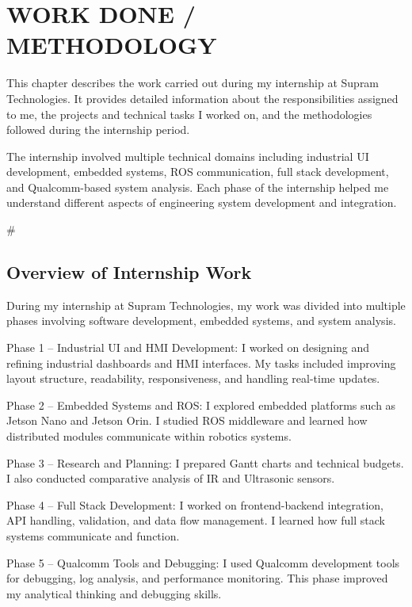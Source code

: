 \documentclass[12pt,a4paper]{report}
\begin{document}
\chapter{WORK DONE / METHODOLOGY}
\label{ch:work}


This chapter describes the work carried out during my internship at Supram Technologies. It provides detailed information about the responsibilities assigned to me, the projects and technical tasks I worked on, and the methodologies followed during the internship period.


The internship involved multiple technical domains including industrial UI development, embedded systems, ROS communication, full stack development, and Qualcomm-based system analysis. Each phase of the internship helped me understand different aspects of engineering system development and integration.


\#


\section{Overview of Internship Work}

During my internship at Supram Technologies, my work was divided into multiple phases involving software development, embedded systems, and system analysis.


Phase 1 – Industrial UI and HMI Development: I worked on designing and refining industrial dashboards and HMI interfaces. My tasks included improving layout structure, readability, responsiveness, and handling real-time updates.


Phase 2 – Embedded Systems and ROS: I explored embedded platforms such as Jetson Nano and Jetson Orin. I studied ROS middleware and learned how distributed modules communicate within robotics systems.


Phase 3 – Research and Planning: I prepared Gantt charts and technical budgets. I also conducted comparative analysis of IR and Ultrasonic sensors.


Phase 4 – Full Stack Development: I worked on frontend-backend integration, API handling, validation, and data flow management. I learned how full stack systems communicate and function.


Phase 5 – Qualcomm Tools and Debugging: I used Qualcomm development tools for debugging, log analysis, and performance monitoring. This phase improved my analytical thinking and debugging skills.
\end{document}
